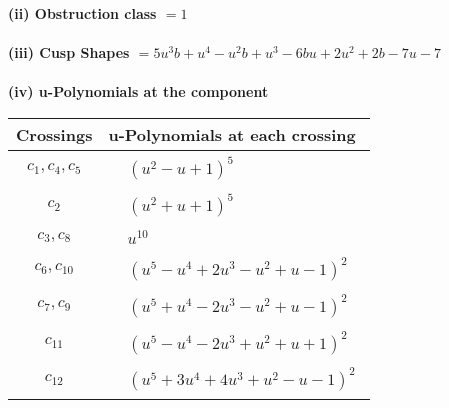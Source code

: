 \documentclass[1p]{elsarticle_modified}
\theoremstyle{definition}
\begin{document}
\flushleft \textbf{(ii) Obstruction class $= 1$}\\~\\
\flushleft \textbf{(iii) Cusp Shapes $= 5 u^3 b+u^4- u^2 b+u^3-6 b u+2 u^2+2 b-7 u-7$}\\~\\
\newpage\renewcommand{\arraystretch}{1}
\flushleft \textbf{(iv) u-Polynomials at the component}\newline \\
\begin{tabular}{m{50pt}|m{274pt}}
Crossings & \hspace{64pt}u-Polynomials at each crossing \\
\hline $$\begin{aligned}c_{1},c_{4},c_{5}\end{aligned}$$&$\begin{aligned}
&(u^2- u+1)^5
\end{aligned}$\\
\hline $$\begin{aligned}c_{2}\end{aligned}$$&$\begin{aligned}
&(u^2+u+1)^5
\end{aligned}$\\
\hline $$\begin{aligned}c_{3},c_{8}\end{aligned}$$&$\begin{aligned}
&u^{10}
\end{aligned}$\\
\hline $$\begin{aligned}c_{6},c_{10}\end{aligned}$$&$\begin{aligned}
&(u^5- u^4+2 u^3- u^2+u-1)^2
\end{aligned}$\\
\hline $$\begin{aligned}c_{7},c_{9}\end{aligned}$$&$\begin{aligned}
&(u^5+u^4-2 u^3- u^2+u-1)^2
\end{aligned}$\\
\hline $$\begin{aligned}c_{11}\end{aligned}$$&$\begin{aligned}
&(u^5- u^4-2 u^3+u^2+u+1)^2
\end{aligned}$\\
\hline $$\begin{aligned}c_{12}\end{aligned}$$&$\begin{aligned}
&(u^5+3 u^4+4 u^3+u^2- u-1)^2
\end{aligned}$\\
\hline
\end{tabular}\\~\\
\end{document}
